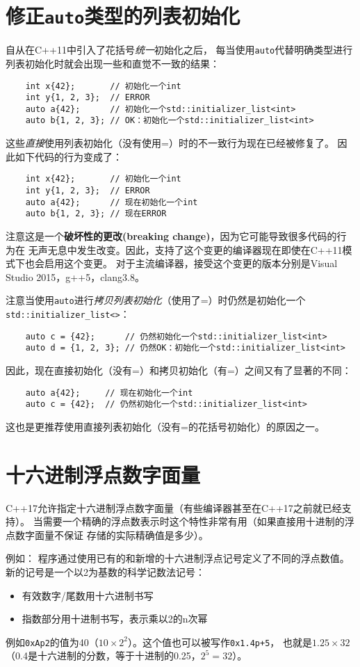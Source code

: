 \section{修正\texttt{auto}类型的列表初始化}\label{ch8.4}
自从在C++11中引入了花括号\emph{统一}初始化之后，
每当使用\texttt{auto}代替明确类型进行列表初始化时就会出现一些和直觉不一致的结果：
\begin{lstlisting}
    int x{42};       // 初始化一个int
    int y{1, 2, 3};  // ERROR
    auto a{42};      // 初始化一个std::initializer_list<int>
    auto b{1, 2, 3}; // OK：初始化一个std::initializer_list<int>
\end{lstlisting}
这些\emph{直接}使用列表初始化（没有使用=）时的不一致行为现在已经被修复了。
因此如下代码的行为变成了：
\begin{lstlisting}
    int x{42};       // 初始化一个int
    int y{1, 2, 3};  // ERROR
    auto a{42};      // 现在初始化一个int
    auto b{1, 2, 3}; // 现在ERROR
\end{lstlisting}
注意这是一个\textbf{破坏性的更改(breaking change)}，因为它可能导致很多代码的行为在
无声无息中发生改变。因此，支持了这个变更的编译器现在即使在C++11模式下也会启用这个变更。
对于主流编译器，接受这个变更的版本分别是Visual Studio 2015，g++5，clang3.8。

注意当使用\texttt{auto}进行\emph{拷贝列表初始化}（使用了=）时仍然是初始化一个
\texttt{std::initializer\_list<>}：
\begin{lstlisting}
    auto c = {42};      // 仍然初始化一个std::initializer_list<int>
    auto d = {1, 2, 3}; // 仍然OK：初始化一个std::initializer_list<int>
\end{lstlisting}
因此，现在直接初始化（没有=）和拷贝初始化（有=）之间又有了显著的不同：
\begin{lstlisting}
    auto a{42};     // 现在初始化一个int
    auto c = {42};  // 仍然初始化一个std::initializer_list<int>
\end{lstlisting}
这也是更推荐使用直接列表初始化（没有=的花括号初始化）的原因之一。

\section{十六进制浮点数字面量}\label{ch8.5}
C++17允许指定十六进制浮点数字面量（有些编译器甚至在C++17之前就已经支持）。
当需要一个精确的浮点数表示时这个特性非常有用（如果直接用十进制的浮点数字面量不保证
存储的实际精确值是多少）。

例如：
程序通过使用已有的和新增的十六进制浮点记号定义了不同的浮点数值。
新的记号是一个以2为基数的科学记数法记号：
\begin{itemize}
    \item 有效数字/尾数用十六进制书写
    \item 指数部分用十进制书写，表示乘以2的n次幂
\end{itemize}
例如\texttt{0xAp2}的值为40（$10\times2^2$）。这个值也可以被写作\texttt{0x1.4p+5}，
也就是$1.25\times32$（0.4是十六进制的分数，等于十进制的0.25，$2^5=32$）。

